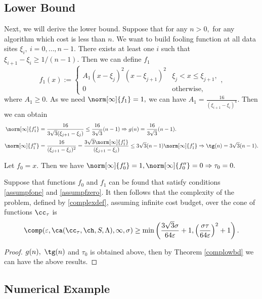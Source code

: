 \subsection{Lower Bound}
Next, we will derive the lower bound. Suppose that for any $n>0,$ for any algorithm which cost is less than $n.$
We want to build fooling function at all data sites $\xi_{i}, \ i=0,\ldots,n-1.$
There exists at least one $i$ such that $\xi_{i+1}-\xi_{i}\ge 1/(n-1).$
Then we can define $f_{1}$
$$f_{1}(x):=\left\{\begin{matrix}
A_{1}(x-\xi_{j})^{2}(x-\xi_{j+1})^{2} & \xi_{j}< x \leq \xi_{j+1},\\
0 & \text{otherwise},
\end{matrix}\right.,$$
where $A_{1} \ge 0.$ As we need $\norm[\infty]{f_1}=1,$ we can have $A_{1}=\frac{16}{(\xi_{i+1}-\xi_{i})^4}.$
Then we can obtain
\begin{align*}
\norm[\infty]{f'_1}&=\frac{16}{3\sqrt{3}(\xi_{j+1}-\xi_{j})}\leq \frac{16}{3\sqrt{3}}(n-1) \Rightarrow g(n)=\frac{16}{3\sqrt{3}}(n-1).\\
\norm[\infty]{f''_1}&=\frac{16}{(\xi_{j+1}-\xi_{j})^2}
=\frac{3\sqrt{3}\norm[\infty]{f'_1}}{(\xi_{j+1}-\xi_{j})}
 \leq 3\sqrt{3}(n-1)\norm[\infty]{f'_1}\Rightarrow \tg(n)=3\sqrt{3}(n-1).
\end{align*}

Let $f_0=x.$ Then we have $\norm[\infty]{f'_0}=1, \norm[\infty]{f''_0}=0 \Rightarrow \tau_0=0.$

\begin{theorem} \label{complowbdappr} Suppose that functions $f_{0}$ and $f_1$ can be found that satisfy conditions \eqref{assumpfone} and \eqref{assumpfzero}.  It then follows that the complexity of the problem, defined by \eqref{complexdef}, assuming infinite cost budget, over the cone of functions $\cc_{\tau}$ is
$$
\comp(\varepsilon,\ca(\cc_{\tau},\ch,S,\Lambda),\infty,\sigma)
\ge \min\left(\frac{3\sqrt{3}\sigma}{64 \varepsilon}+1, \left(\frac{\sigma\tau}{64\varepsilon}\right)^{2}+1 \right).
$$
\end{theorem}

\begin{proof}
$g(n), \ \tg(n)$ and $\tau_0$ is obtained above, then by Theorem \ref{complowbd}
we can have the above results.
\end{proof}

\subsection{Numerical Example}

